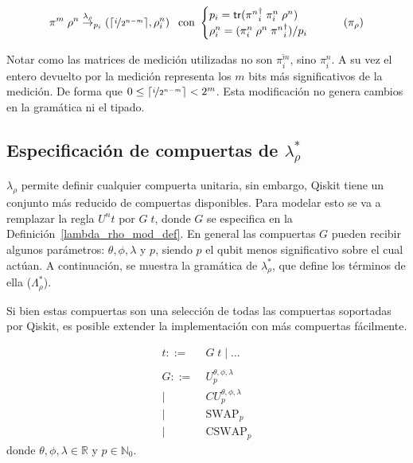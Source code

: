 \begin{equation*}
\pi^m\;\rho^n \overset{\lambda_\rho}{\rightarrow}_{p_i} (\lceil \nicefrac{i}{2^{n-m}}\rceil, \rho_i^n) \;\, \text{ con }
\begin{cases}
p_i = \mathsf{tr}({\pi^n}_i^\dagger\;\pi^n_i\;\rho^n)\\
\rho^n_i = (\pi^n_i\;\rho^n\;{\pi^n}_i^\dagger)/p_i
\end{cases} \tag{$\pi_\rho$}
\end{equation*}

Notar como las matrices de medición utilizadas no son $\overline{\pi^m_i}$, sino $\pi^n_i$. A su vez el entero devuelto por la medición representa los $m$ bits más significativos de la medición. De forma que $0\leq \lceil \nicefrac{i}{2^{n-m}}\rceil < 2^m$. Esta modificación no genera cambios en la gramática ni el tipado.

\subsection{\texorpdfstring{Especificación de compuertas de $\lambda_\rho^*$}{Especificación de compuertas de Lambda Rho*}}
$\lambda_\rho$ permite definir cualquier compuerta unitaria, sin embargo, Qiskit tiene un conjunto más reducido de compuertas disponibles. Para modelar esto se va a remplazar la regla $U^n t$ por $G\;t$, donde $G$ se especifica en la Definición~\ref{lambda_rho_mod_def}. En general las compuertas $G$ pueden recibir algunos parámetros: $\theta, \phi, \lambda$ y $p$, siendo $p$ el qubit menos significativo sobre el cual actúan. A continuación, se muestra la gramática de $\lambda_\rho^*$, que define los términos de ella ($\Lambda_\rho^*$).

\begin{observacion}
    Si bien estas compuertas son una selección de todas las compuertas soportadas por Qiskit, es posible extender la implementación con más compuertas fácilmente.
\end{observacion}

\begin{definicion}\label{lambda_rho_mod_def}
\begin{align*}
t ::=&\; G\;t \mid \dots \\
\\
G ::=&\; U^{\theta, \phi, \lambda}_p \tag{Compuerta unaria general}\\
 \mid&\; CU^{\theta, \phi, \lambda}_p \tag{Compuerta unaria general controlada}\\
 \mid&\; \textrm{SWAP}_p \tag{Swap}\\
 \mid&\; \textrm{CSWAP}_p \tag{Compuerta de Fredkin}
\end{align*}
donde $\theta, \phi, \lambda \in \mathbb{R}$ y $p \in \mathbb{N}_0$.
\end{definicion}

